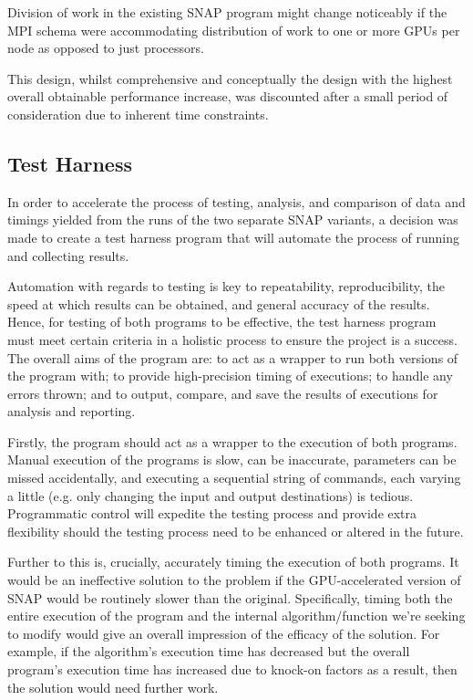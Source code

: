 \documentclass[conference]{IEEEtran}
\begin{document}
Division of work in the existing SNAP program might change noticeably if the MPI schema were accommodating distribution of work to one or more GPUs per node as opposed to just processors.

This design, whilst comprehensive and conceptually the design with the highest overall obtainable performance increase, was discounted after a small period of consideration due to inherent time constraints.


\subsection{Test Harness}

In order to accelerate the process of testing, analysis, and comparison of data and timings yielded from the runs of the two separate SNAP variants, a decision was made to create a test harness program that will automate the process of running and collecting results.

Automation with regards to testing is key to repeatability, reproducibility, the speed at which results can be obtained, and general accuracy of the results. Hence, for testing of both programs to be effective, the test harness program must meet certain criteria in a holistic process to ensure the project is a success. The overall aims of the program are: to act as a wrapper to run both versions of the program with; to provide high-precision timing of executions; to handle any errors thrown; and to output, compare, and save the results of executions for analysis and reporting.

Firstly, the program should act as a wrapper to the execution of both programs. Manual execution of the programs is slow, can be inaccurate, parameters can be missed accidentally, and executing a sequential string of commands, each varying a little (e.g. only changing the input and output destinations) is tedious. Programmatic control will expedite the testing process and provide extra flexibility should the testing process need to be enhanced or altered in the future.

Further to this is, crucially, accurately timing the execution of both programs. It would be an ineffective solution to the problem if the GPU-accelerated version of SNAP would be routinely slower than the original. Specifically, timing both the entire execution of the program and the internal algorithm/function we're seeking to modify would give an overall impression of the efficacy of the solution. For example, if the algorithm's execution time has decreased but the overall program's execution time has increased due to knock-on factors as a result, then the solution would need further work.
\end{document}
